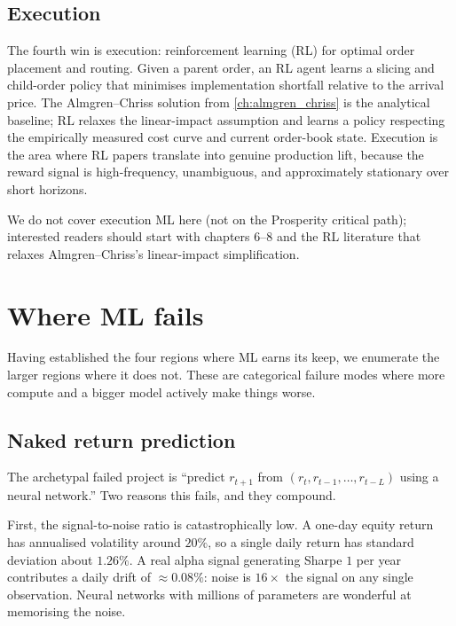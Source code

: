 \subsection{Execution}
\label{subsec:ml_execution}

The fourth win is execution: reinforcement learning (RL) for
optimal order placement and routing. Given a parent order, an RL
agent learns a slicing and child-order policy that minimises
implementation shortfall relative to the arrival price. The
Almgren--Chriss solution from \cref{ch:almgren_chriss} is the
analytical baseline; RL relaxes the linear-impact assumption and
learns a policy respecting the empirically measured cost curve and
current order-book state. Execution is the area where RL papers
translate into genuine production lift, because the reward signal
is high-frequency, unambiguous, and approximately stationary over
short horizons.

We do not cover execution ML here (not on the Prosperity critical
path); interested readers should start with
\citet{cartea2015algorithmic} chapters 6--8 and the RL literature
that relaxes Almgren--Chriss's linear-impact simplification.

\section{Where ML fails}
\label{sec:ml_where_fails}

Having established the four regions where ML earns its keep, we
enumerate the larger regions where it does not. These are
categorical failure modes where more compute and a bigger model
actively make things worse.

\subsection{Naked return prediction}
\label{subsec:ml_naked_return}

The archetypal failed project is ``predict $r_{t+1}$ from
$(r_t, r_{t-1}, \ldots, r_{t-L})$ using a neural network.'' Two
reasons this fails, and they compound.

First, the signal-to-noise ratio is catastrophically low. A
one-day equity return has annualised volatility around $20\%$, so
a single daily return has standard deviation about $1.26\%$. A
real alpha signal generating Sharpe $1$ per year contributes a
daily drift of $\approx 0.08\%$: noise is $16\times$ the signal
on any single observation. Neural networks with millions of
parameters are wonderful at memorising the noise.

